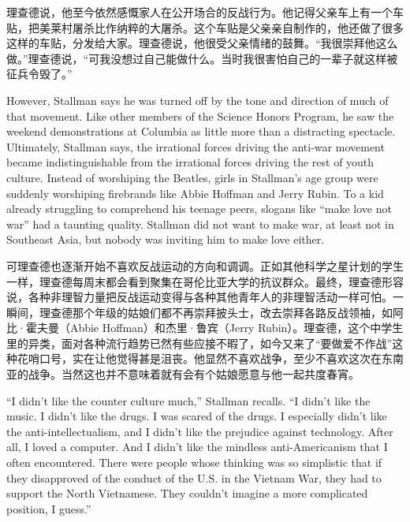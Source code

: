 \ifdefined\chs
理查德说，他至今依然感慨家人在公开场合的反战行为。他记得父亲车上有一个车贴，把美莱村屠杀比作纳粹的大屠杀。这个车贴是父亲亲自制作的，他还做了很多这样的车贴，分发给大家。理查德说，他很受父亲情绪的鼓舞。``我很崇拜他这么做。''理查德说，``可我没想过自己能做什么。当时我很害怕自己的一辈子就这样被征兵令毁了。''
\fi

\ifdefined\eng
However, Stallman says he was turned off by the tone and direction of much of that movement. Like other members of the Science Honors Program, he saw the weekend demonstrations at Columbia as little more than a distracting spectacle. Ultimately, Stallman says, the irrational forces driving the anti-war movement became indistinguishable from the irrational forces driving the rest of youth culture. Instead of worshiping the Beatles, girls in Stallman's age group were suddenly worshiping firebrands like Abbie Hoffman and Jerry Rubin. To a kid already struggling to comprehend his teenage peers, slogans like ``make love not war'' had a taunting quality. Stallman did not want to make war, at least not in Southeast Asia, but nobody was inviting him to make love either.
\fi

\ifdefined\chs
可理查德也逐渐开始不喜欢反战运动的方向和调调。正如其他科学之星计划的学生一样，理查德每周末都会看到聚集在哥伦比亚大学的抗议群众。最终，理查德形容说，各种非理智力量把反战运动变得与各种其他青年人的非理智活动一样可怕。一瞬间，理查德那个年级的姑娘们都不再崇拜披头士，改去崇拜各路反战领袖，如阿比·霍夫曼（Abbie Hoffman）和杰里·鲁宾（Jerry Rubin）。理查德，这个中学生里的异类，面对各种流行趋势已然有些应接不暇了，如今又来了``要做爱不作战''这种花哨口号，实在让他觉得甚是沮丧。他显然不喜欢战争，至少不喜欢这次在东南亚的战争。当然这也并不意味着就有会有个姑娘愿意与他一起共度春宵。
\fi

\ifdefined\eng
``I didn't like the counter culture much,'' Stallman recalls. ``I didn't like the music. I didn't like the drugs. I was scared of the drugs. I especially didn't like the anti-intellectualism, and I didn't like the prejudice against technology. After all, I loved a computer. And I didn't like the mindless anti-Americanism that I often encountered. There were people whose thinking was so simplistic that if they disapproved of the conduct of the U.S. in the Vietnam War, they had to support the North Vietnamese. They couldn't imagine a more complicated position, I guess.''
\fi

